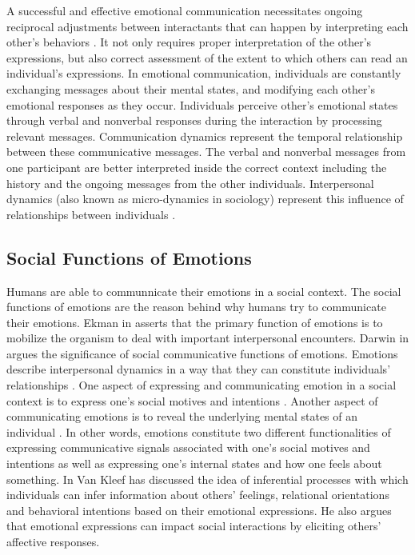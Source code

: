 \documentclass[12pt]{report}
\begin{document}
A successful and effective emotional communication necessitates ongoing
reciprocal adjustments between interactants that can happen by interpreting each
other's behaviors \cite{parkinson:emotion-social-interaction}. It not only
requires proper interpretation of the other's expressions, but also correct
assessment of the extent to which others can read an individual's expressions.
In emotional communication, individuals are constantly exchanging messages about
their mental states, and modifying each other's emotional responses as they
occur. Individuals perceive other's emotional states through verbal and
nonverbal responses during the interaction by processing relevant messages.
Communication dynamics represent the temporal relationship between these
communicative messages. The verbal and nonverbal messages from one participant
are better interpreted inside the correct context including the history and the
ongoing messages from the other individuals. Interpersonal dynamics (also known
as micro-dynamics in sociology) represent this influence of relationships
between individuals \cite{louis:communication-dynamic}.

\subsection{Social Functions of Emotions}
\label{section-emotion-social-functions}

Humans are able to communnicate their emotions in a social context. The social
functions of emotions are the reason behind why humans try to communicate their
emotions. Ekman in \cite{ekman:argument-emotions} asserts that the primary
function of emotions is to mobilize the organism to deal with important
interpersonal encounters. Darwin in \cite{darwin:emotion-expression} argues the
significance of social communicative functions of emotions. Emotions describe
interpersonal dynamics in a way that they can constitute individuals'
relationships \cite{parkinson:emotions-social, tiedens:social-life}. One aspect
of expressing and communicating emotion in a social context is to express one's
social motives and intentions \cite{hess:darwin-emotion}. Another aspect of
communicating emotions is to reveal the underlying mental states of an
individual \cite{parkinson:emotion-communication}. In other words, emotions
constitute two different functionalities of expressing communicative signals
associated with one's social motives and intentions as well as expressing one's
internal states and how one feels about something. In
\cite{kleef:emotion-regulate-social} Van Kleef has discussed the idea of
inferential processes with which individuals can infer information about others'
feelings, relational orientations and behavioral intentions based on their
emotional expressions. He also argues that emotional expressions can impact
social interactions by eliciting others' affective responses.
\end{document}
